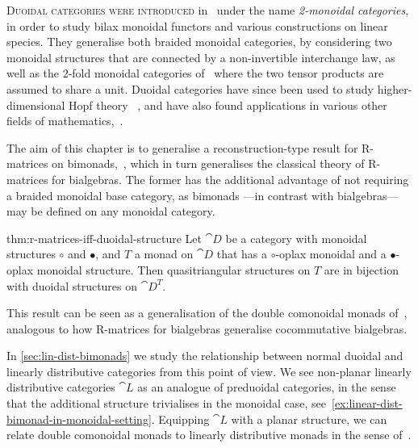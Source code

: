 \textsc{Duoidal categories were introduced}
in~\cite{Aguiar2010} under the name \emph{2-monoidal categories},
in order to study bilax monoidal functors and various constructions on linear species.
They generalise both
braided monoidal categories,
by considering two monoidal structures that are connected by a non-invertible interchange law,
as well as the 2-fold monoidal categories of~\cite{balteanu03:iterat}
where the two tensor products are assumed to share a unit.
Duoidal categories have since been used to study higher-dimensional Hopf theory%
~\cite{boehm13:hopf,booker13:tannak,aguiar18:monad,franco20:duoid,boehm21:masch-hopf},
and have also found applications in
various other fields of mathematics,~\cite{garner16:commut,shapiro22:duoid-struc-compos-depen,román24:strin-diagr-physic-duoid-categ,torii24:map}.

The aim of this chapter is to generalise a reconstruction-type result for R\hyp{}matrices on bimonads,~\cite[Proposition~8.5]{Bruguieres2007},
which in turn generalises the classical theory of R\hyp{}matrices for bialgebras.
The former has the additional advantage of not requiring a braided monoidal base category, as bimonads%
—in contrast with bialgebras—%
may be defined on any monoidal category.

\begin{reptheorem}{thm:r-matrices-iff-duoidal-structure}
  Let \(\cat{D}\) be a category with monoidal structures \(\circ\) and \(\bullet\),
  and \(T\) a monad on \(\cat{D}\) that has a \(\circ\)\hyp{}oplax monoidal and a \(\bullet\)\hyp{}oplax monoidal structure.
  Then quasi\-triangular structures on \(T\) are in bijection with duoidal structures on \(\cat{D}^T\).
\end{reptheorem}

This result can be seen as a generalisation of the double comonoidal monads of~\cite[Section~7]{Aguiar2010},
analogous to how R\hyp{}matrices for bialgebras generalise cocommutative bialgebras.

In \cref{sec:lin-dist-bimonads} we study the relationship between normal duoidal
and linearly distributive categories from this point of view.
We see non-planar linearly distributive categories \(\cat{L}\) as an analogue of preduoidal categories,
in the sense that the additional structure trivialises in the monoidal case,
see~\cref{ex:linear-dist-bimonad-in-monoidal-setting}.
Equipping \(\cat{L}\) with a planar structure,
we can relate double comonoidal monads
to linearly distributive monads in the sense of~\cite{pastro12:note}.


